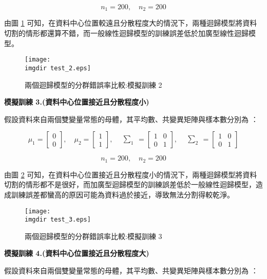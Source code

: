 \[n_1 = 200, \quad n_2 = 200\]

由圖 \ref{fig:test_2} 可知，在資料中心位置較遠且分散程度大的情況下，兩種迴歸模型將資料切割的情形都還算不錯，而一般線性迴歸模型的訓練誤差低於加廣型線性迴歸模型。
\begin{figure}[H]
    \centering
        \texttt{[image: \\imgdir test\_2.eps]}
    \caption{兩個迴歸模型的分群錯誤率比較:模擬訓練 2}
    \label{fig:test_2}
\end{figure}

\textbf{\large 模擬訓練 3.(資料中心位置接近且分散程度小)}

假設資料來自兩個雙變量常態的母體，其平均數、共變異矩陣與樣本數分別為 ：

\[\mu_1 = \begin{bmatrix}
0 \\
0
\end{bmatrix}, \quad \mu_2 = \begin{bmatrix}
1 \\
1
\end{bmatrix}, \quad \begin{matrix} \sum_{1} \end{matrix} = \begin{bmatrix}
1 & 0\\
0 & 1
\end{bmatrix}, \quad \begin{matrix} \sum_{2} \end{matrix} = \begin{bmatrix}
1 & 0\\
0 & 1
\end{bmatrix}\]

\[n_1 = 200, \quad n_2 = 200\]

由圖 \ref{fig:test_3} 可知，在資料中心位置接近且分散程度小的情況下，兩種迴歸模型將資料切割的情形都不是很好，而加廣型迴歸模型的訓練誤差低於一般線性迴歸模型，造成訓練誤差都蠻高的原因可能為資料過於接近，導致無法分割得較乾淨。
\begin{figure}[H]
    \centering
        \texttt{[image: \\imgdir test\_3.eps]}
    \caption{兩個迴歸模型的分群錯誤率比較:模擬訓練 3}
    \label{fig:test_3}
\end{figure}

\textbf{\large 模擬訓練 4.(資料中心位置接近且分散程度大)}

假設資料來自兩個雙變量常態的母體，其平均數、共變異矩陣與樣本數分別為 ：

